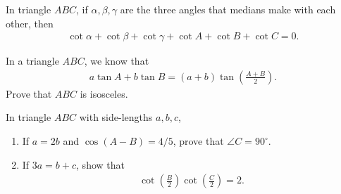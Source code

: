 \documentclass[12pt,a4paper]{memoir}
\theoremstyle{definition}
\begin{document}
\begin{question}
	In triangle $ABC$, if $\alpha,\beta,\gamma$ are the three angles that medians make with each other, then
	\begin{align*}
		\cot\alpha + \cot\beta + \cot\gamma + \cot A + \cot B + \cot C = 0.
	\end{align*}
\end{question}

\begin{question}
	In a triangle $ABC$, we know that
	\begin{align*}
		a\tan A + b\tan B = (a+b)\tan\left(\frac{A+B}{2}\right).
	\end{align*}
	Prove that $ABC$ is isosceles.
\end{question}

\begin{question}
	In triangle $ABC$ with side-lengths $a,b,c$,
	\begin{enumerate}
		\item If $a=2b$ and $\cos(A-B)=4/5$, prove that $\angle C=90^\circ$.
		\item If $3a=b+c$, show that
		\begin{align*}
			\cot\left(\frac{B}{2}\right)\cot\left(\frac{C}{2}\right)=2.
		\end{align*}
	\end{enumerate}
\end{question}
\end{document}
